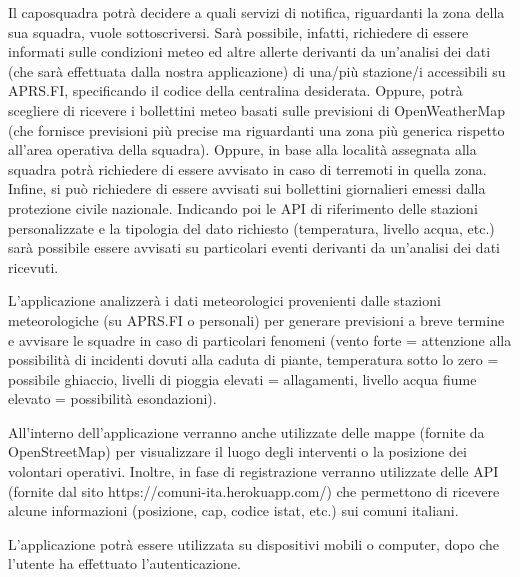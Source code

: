 Il caposquadra potrà decidere a quali servizi di notifica, riguardanti la zona della sua squadra, vuole sottoscriversi. Sarà possibile, infatti, richiedere di essere informati sulle condizioni meteo ed altre allerte derivanti da un’analisi dei dati (che sarà effettuata dalla nostra applicazione) di una/più stazione/i accessibili su APRS.FI, specificando il codice della centralina desiderata. Oppure, potrà scegliere di ricevere i bollettini meteo basati sulle previsioni di OpenWeatherMap (che fornisce previsioni più precise ma riguardanti una zona più generica rispetto all’area operativa della squadra). Oppure, in base alla località assegnata alla squadra potrà richiedere di essere avvisato in caso di terremoti in quella zona. Infine, si può richiedere di essere avvisati sui bollettini giornalieri emessi dalla protezione civile nazionale. Indicando poi le API di riferimento delle stazioni personalizzate e la tipologia del dato richiesto (temperatura, livello acqua, etc.) sarà possibile essere avvisati su particolari eventi derivanti da un’analisi dei dati ricevuti. 

L'applicazione analizzerà i dati meteorologici provenienti dalle stazioni meteorologiche (su APRS.FI o personali) per generare previsioni a breve termine e avvisare le squadre in caso di particolari fenomeni (vento forte = attenzione alla possibilità di incidenti dovuti alla caduta di piante, temperatura sotto lo zero = possibile ghiaccio, livelli di pioggia elevati = allagamenti, livello acqua fiume elevato = possibilità esondazioni). 

All’interno dell’applicazione verranno anche utilizzate delle mappe (fornite da OpenStreetMap) per visualizzare il luogo degli interventi o la posizione dei volontari operativi. Inoltre, in fase di registrazione verranno utilizzate delle API (fornite dal sito https://comuni-ita.herokuapp.com/) che permettono di ricevere alcune informazioni (posizione, cap, codice istat, etc.) sui comuni italiani.

L’applicazione potrà essere utilizzata su dispositivi mobili o computer, dopo che l'utente ha effettuato l'autenticazione. 